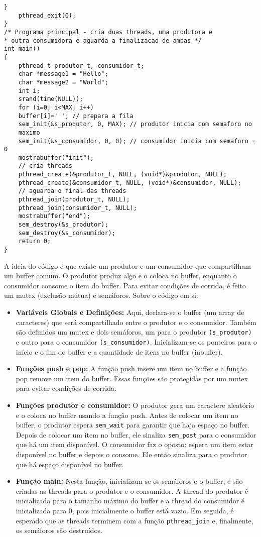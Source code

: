 \documentclass[10pt]{article}
\begin{document}
\begin{lstlisting}[caption=Código fornecido pelo enunciado]
    }
    pthread_exit(0);
}
/* Programa principal - cria duas threads, uma produtora e
* outra consumidora e aguarda a finalizacao de ambas */
int main()
{
    pthread_t produtor_t, consumidor_t;
    char *message1 = "Hello";
    char *message2 = "World";
    int i;
    srand(time(NULL));
    for (i=0; i<MAX; i++)
    buffer[i]=' '; // prepara a fila
    sem_init(&s_produtor, 0, MAX); // produtor inicia com semaforo no
    maximo
    sem_init(&s_consumidor, 0, 0); // consumidor inicia com semaforo = 0
    mostrabuffer("init");
    // cria threads
    pthread_create(&produtor_t, NULL, (void*)&produtor, NULL);
    pthread_create(&consumidor_t, NULL, (void*)&consumidor, NULL);
    // aguarda o final das threads
    pthread_join(produtor_t, NULL);
    pthread_join(consumidor_t, NULL);
    mostrabuffer("end");
    sem_destroy(&s_produtor);
    sem_destroy(&s_consumidor);
    return 0;
}
\end{lstlisting}
A ideia do código é que existe um produtor e um consumidor que compartilham um buffer comum. O produtor produz algo e o coloca no buffer, enquanto o consumidor consome o item do buffer. Para evitar condições de corrida, é feito um mutex (exclusão mútua) e semáforos.
Sobre o código em si:
\begin{itemize}
\item \textbf{Variáveis Globais e Definições:} Aqui, declara-se o buffer (um array de caracteres) que será compartilhado entre o produtor e o consumidor. Também são definidos um mutex e dois semáforos, um para o produtor \verb|(s_produtor)| e outro para o consumidor \verb|(s_consumidor)|. Inicializam-se os ponteiros para o início e o fim do buffer e a quantidade de itens no buffer (inbuffer).
\item \textbf{Funções push e pop:} A função push insere um item no buffer e a função pop remove um item do buffer. Essas funções são protegidas por um mutex para evitar condições de corrida.
\item \textbf{Funções produtor e consumidor:} O produtor gera um caractere aleatório e o coloca no buffer usando a função push. Antes de colocar um item no buffer, o produtor espera \verb|sem_wait| para garantir que haja espaço no buffer.
Depois de colocar um item no buffer, ele sinaliza \verb|sem_post| para o consumidor que há um item disponível.
O consumidor faz o oposto: espera um item estar disponível no buffer e depois o consome. Ele então sinaliza para o produtor que há espaço disponível no buffer.
\item \textbf{Função main:} Nesta função, inicializam-se os semáforos e o buffer, e são criadas as threads para o produtor e o consumidor. A thread do produtor é inicializada para o tamanho máximo do buffer e a thread do consumidor é inicializada para 0, pois inicialmente o buffer está vazio. Em seguida, é esperado que as threads terminem com a função \verb|pthread_join| e, finalmente, os semáforos são destruídos.
\end{itemize}
\end{document}
